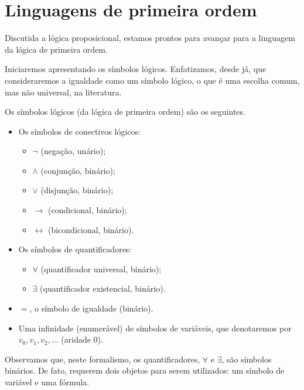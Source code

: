 \section{Linguagens de primeira ordem}\label{sec:linguagensPrimeiraOrdem}

Discutida a lógica proposicional, estamos prontos para avançar para a linguagem da lógica de primeira ordem.

Iniciaremos apresentando os símbolos lógicos.
Enfatizamos, desde já, que consideraremos a igualdade como um símbolo lógico, o que é uma escolha comum, mas não universal, na literatura.

\begin{metadefinition}\label{mdef:simbolosLogicos}
    Os símbolos lógicos (da lógica de primeira ordem) são os seguintes.
    \begin{itemize}
        \item Os símbolos de conectivos lógicos:
        \begin{itemize}
            \item $\neg$ (negação, unário);
            \item $\wedge$ (conjunção, binário);
            \item $\vee$ (disjunção, binário);
            \item $\rightarrow$ (condicional, binário);
            \item $\leftrightarrow$ (bicondicional, binário).
        \end{itemize}
        \item Os símbolos de quantificadores:
        \begin{itemize}
            \item $\forall$ (quantificador universal, binário);
            \item $\exists$ (quantificador existencial, binário).
        \end{itemize}
        \item $=$, o símbolo de igualdade (binário).
        \item Uma infinidade (enumerável) de símbolos de variáveis, que denotaremos por $v_0, v_1, v_2, \dots$ (aridade $0$).
    \end{itemize}
\end{metadefinition}

Observamos que, neste formalismo, os quantificadores, $\forall$ e $\exists$, são símbolos binários.
De fato, requerem dois objetos para serem utilizados: um símbolo de variável e uma fórmula.

